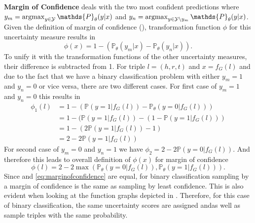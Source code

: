 \textbf{Margin of Confidence}
deals with the two most confident predictions where
$y_m = \argmax_{y \in \mathcal{Y}} \mathds{P}_{\theta}(y | x)$ 
and $y_n = \argmax_{y \in \mathcal{Y} \setminus y_m}{\mathds{P}_{\theta}(y | x)}$.
Given the definition of margin of confidence (), transformation function $\phi$ for this uncertainty measure results in
\begin{equation}
    \phi(x) = 1 - (\mathds{P}_{\theta}(y_m |x) - \mathds{P}_{\theta}(y_n | x)).
\end{equation}
To unify it with the transformation functions of the other uncertainty measures, their difference is subtracted from 1.
For triple $l = (h,r,t)$ and $x = f_G(l)$ and due to the fact that we have a binary classification problem with either $y_m = 1$ and $y_n = 0$ or vice versa, there are two different cases.
For first case of $y_m = 1$ and $y_n = 0$ this results in
\begin{equation}
\begin{split}
\phi_1(l) 
&= 1 - (\mathds{P}(y = 1 |f_G(l)) - \mathds{P}_{\theta}(y = 0 | f_G(l))) \\
&= 1 - (\mathds{P}(y = 1 |f_G(l)) -  (1 - \mathds{P}(y = 1 | f_G(l))) \\
&= 1 - (2 \mathds{P}(y = 1 |f_G(l)) - 1) \\
&= 2 - 2 \mathds{P}(y = 1 |f_G(l))
\end{split}
\end{equation}
For second case of $y_m = 0$ and $y_n = 1$ we have  $\phi_2 = 2 - 2 \mathds{P}(y = 0 |f_G(l))$. 
And therefore this leads to overall definition of $\phi(x)$ for margin of confidence
\begin{equation} \label{eq:marginofconfidence}
    \phi(l) = 2 - 2 \max(\mathds{P}_{\theta}(y = 0 |f_G(l)), \mathds{P}_{\theta}(y = 1 |f_G(l))).
\end{equation}
Since  and \ref{eq:marginofconfidence} are equal, for binary classification sampling by a margin of confidence is the same as sampling by least confidence.
This is also evident when looking at the function graphs depicted in .
Therefore, for this case of binary classification, the same uncertainty scores are assigned and\usmax as well as \ussoftmax sample triples with the same probability.

